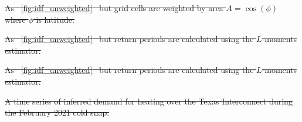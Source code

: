 \documentclass[12pt]{iopart}
\providecommand{\DIFdeltex}[1]{{\protect\color{red}\sout{#1}}}                      %
\providecommand{\DIFdelend}{} %
\providecommand{\DIFdelFL}[1]{\DIFdel{#1}} %
\providecommand{\DIFdel}[1]{\texorpdfstring{\DIFdeltex{#1}}{}} %
\DeclareRobustCommand{\DIFdelend}{\DIFOaddend \let\includegraphics\DIFOincludegraphics} %
\begin{document}
{%
  \DIFdelFL{As \mbox{%
      \cref{fig:idf_unweighted} }\hspace{0pt}%
    but grid cells are weighted by area $A=\cos(\phi)$ where $\phi$ is latitude.
  }}%

{%
  \DIFdelFL{As \mbox{%
      \cref{fig:idf_unweighted} }\hspace{0pt}%
    but return periods are calculated using the $L$-moments estimator.
  }}%

{%
  \DIFdelFL{As \mbox{%
      \cref{fig:idf_unweighted} }\hspace{0pt}%
    but return periods are calculated using the $L$-moments estimator.
  }}%

{%
  \DIFdelFL{A time series of inferred demand for heating over the Texas Interconnect during the February 2021 cold snap.
  }}%
\DIFdelend
\end{document}
